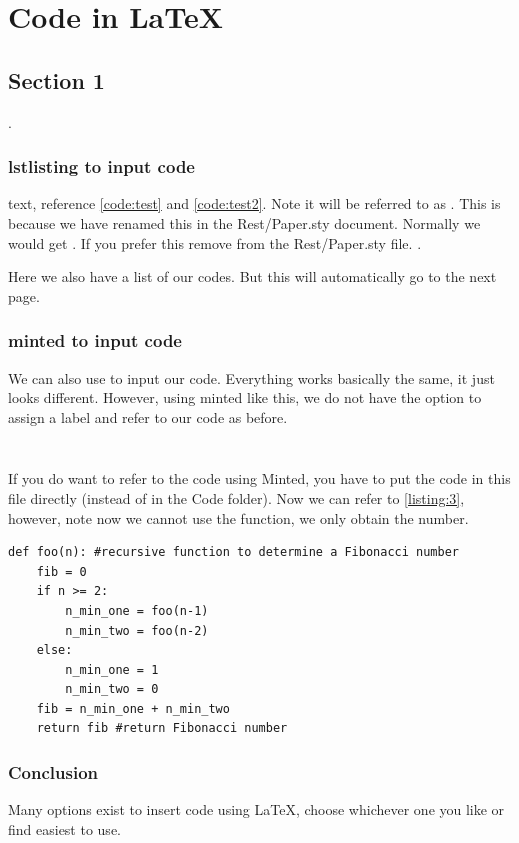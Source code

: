 \chapter{Code in \LaTeX} \label{ch:Chapter3Name}

\section{Section 1}
\blindtext[1]
\cite{test}. 

\subsection{lstlisting to input code}
text, reference \autoref{code:test} and \autoref{code:test2}. Note it will be referred to as . This is because we have renamed this in the Rest/Paper.sty document. Normally we would get . If you prefer this remove \say{\renewcommand{\lstlistingname}{Code}} from the Rest/Paper.sty file.
\cite{test}. 





Here we also have a list of our codes. But this will automatically go to the next page.
\listoflistings

\subsection{minted to input code}
We can also use  to input our code. Everything works basically the same, it just looks different. However, using minted like this, we do not have the option to assign a label and refer to our code as before.

\inputminted[label=minted code example with matlab]{matlab}{Codes/a_corr.m}

\inputminted[label=minted code example with python]{python}{Codes/fib.py}

If you do want to refer to the code using Minted, you have to put the code in this file directly (instead of in the Code folder). Now we can refer to \ref{listing:3}, however, note now we cannot use the  function, we only obtain the number.

\begin{listing}[!ht]
\begin{verbatim}
def foo(n): #recursive function to determine a Fibonacci number
    fib = 0
    if n >= 2:
        n_min_one = foo(n-1)
        n_min_two = foo(n-2)
    else:
        n_min_one = 1
        n_min_two = 0
    fib = n_min_one + n_min_two
    return fib #return Fibonacci number
\end{verbatim}
\caption{Another example of python code with minted}
\label{listing:3}
\end{listing}

\subsection{Conclusion}
Many options exist to insert code using \LaTeX, choose whichever one you like or find easiest to use.